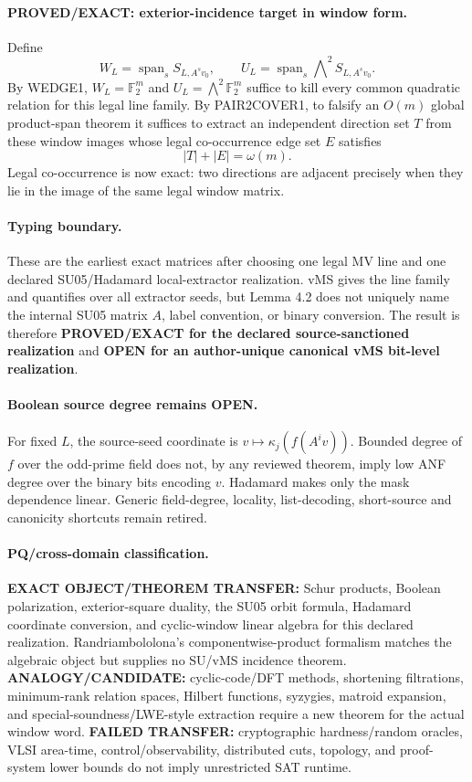 \documentclass[11pt]{article}
\begin{document}
\paragraph{PROVED/EXACT: exterior-incidence target in window form.}
Define
\[
W_L=\operatorname{span}_{s}S_{L,A^sv_0},\qquad
U_L=\operatorname{span}_{s}\bigwedge\nolimits^2S_{L,A^sv_0}.
\]
By WEDGE1, \(W_L=\mathbb F_2^m\) and \(U_L=\bigwedge^2\mathbb F_2^m\) suffice to kill every common quadratic relation for this legal line family. By PAIR2COVER1, to falsify an \(O(m)\) global product-span theorem it suffices to extract an independent direction set \(T\) from these window images whose legal co-occurrence edge set \(E\) satisfies
\[
|T|+|E|=\omega(m).
\]
Legal co-occurrence is now exact: two directions are adjacent precisely when they lie in the image of the same legal window matrix.

\paragraph{Typing boundary.}
These are the earliest exact matrices after choosing one legal MV line and one declared SU05/Hadamard local-extractor realization. vMS gives the line family and quantifies over all extractor seeds, but Lemma 4.2 does not uniquely name the internal SU05 matrix \(A\), label convention, or binary conversion. The result is therefore \textbf{PROVED/EXACT for the declared source-sanctioned realization} and \textbf{OPEN for an author-unique canonical vMS bit-level realization}.

\paragraph{Boolean source degree remains OPEN.}
For fixed \(L\), the source-seed coordinate is \(v\mapsto\kappa_j(f(A^iv))\). Bounded degree of \(f\) over the odd-prime field does not, by any reviewed theorem, imply low ANF degree over the binary bits encoding \(v\). Hadamard makes only the mask dependence linear. Generic field-degree, locality, list-decoding, short-source and canonicity shortcuts remain retired.

\paragraph{PQ/cross-domain classification.}
\textbf{EXACT OBJECT/THEOREM TRANSFER:} Schur products, Boolean polarization, exterior-square duality, the SU05 orbit formula, Hadamard coordinate conversion, and cyclic-window linear algebra for this declared realization. Randriambololona's componentwise-product formalism matches the algebraic object but supplies no SU/vMS incidence theorem.
\textbf{ANALOGY/CANDIDATE:} cyclic-code/DFT methods, shortening filtrations, minimum-rank relation spaces, Hilbert functions, syzygies, matroid expansion, and special-soundness/LWE-style extraction require a new theorem for the actual window word.
\textbf{FAILED TRANSFER:} cryptographic hardness/random oracles, VLSI area-time, control/observability, distributed cuts, topology, and proof-system lower bounds do not imply unrestricted SAT runtime.
\end{document}
